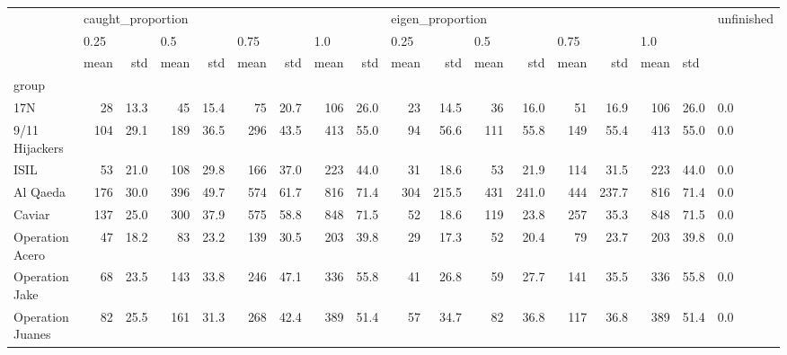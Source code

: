 \begin{tabular}{lrrrrrrrrrrrrrrrrl}
\toprule
{} & \multicolumn{8}{l}{caught\_proportion} & \multicolumn{8}{l}{eigen\_proportion} & unfinished \\
{} & \multicolumn{2}{l}{0.25} & \multicolumn{2}{l}{0.5} & \multicolumn{2}{l}{0.75} & \multicolumn{2}{l}{1.0} & \multicolumn{2}{l}{0.25} & \multicolumn{2}{l}{0.5} & \multicolumn{2}{l}{0.75} & \multicolumn{3}{l}{1.0} \\
{} &              mean &   std & mean &   std & mean &   std & mean &   std &             mean &    std & mean &    std & mean &    std & mean & \multicolumn{2}{l}{std} \\
group                &                   &       &      &       &      &       &      &       &                  &        &      &        &      &        &      &       &            \\
\midrule
17N                  &                28 &  13.3 &   45 &  15.4 &   75 &  20.7 &  106 &  26.0 &               23 &   14.5 &   36 &   16.0 &   51 &   16.9 &  106 &  26.0 &        0.0 \\
9/11 Hijackers       &               104 &  29.1 &  189 &  36.5 &  296 &  43.5 &  413 &  55.0 &               94 &   56.6 &  111 &   55.8 &  149 &   55.4 &  413 &  55.0 &        0.0 \\
ISIL                 &                53 &  21.0 &  108 &  29.8 &  166 &  37.0 &  223 &  44.0 &               31 &   18.6 &   53 &   21.9 &  114 &   31.5 &  223 &  44.0 &        0.0 \\
Al Qaeda             &               176 &  30.0 &  396 &  49.7 &  574 &  61.7 &  816 &  71.4 &              304 &  215.5 &  431 &  241.0 &  444 &  237.7 &  816 &  71.4 &        0.0 \\
Caviar               &               137 &  25.0 &  300 &  37.9 &  575 &  58.8 &  848 &  71.5 &               52 &   18.6 &  119 &   23.8 &  257 &   35.3 &  848 &  71.5 &        0.0 \\
Operation Acero      &                47 &  18.2 &   83 &  23.2 &  139 &  30.5 &  203 &  39.8 &               29 &   17.3 &   52 &   20.4 &   79 &   23.7 &  203 &  39.8 &        0.0 \\
Operation Jake       &                68 &  23.5 &  143 &  33.8 &  246 &  47.1 &  336 &  55.8 &               41 &   26.8 &   59 &   27.7 &  141 &   35.5 &  336 &  55.8 &        0.0 \\
Operation Juanes     &                82 &  25.5 &  161 &  31.3 &  268 &  42.4 &  389 &  51.4 &               57 &   34.7 &   82 &   36.8 &  117 &   36.8 &  389 &  51.4 &        0.0 \\

\end{tabular}
